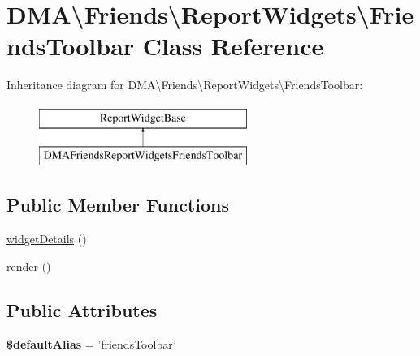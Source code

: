 \hypertarget{classDMA_1_1Friends_1_1ReportWidgets_1_1FriendsToolbar}{\section{D\+M\+A\textbackslash{}Friends\textbackslash{}Report\+Widgets\textbackslash{}Friends\+Toolbar Class Reference}
\label{classDMA_1_1Friends_1_1ReportWidgets_1_1FriendsToolbar}
}
Inheritance diagram for D\+M\+A\textbackslash{}Friends\textbackslash{}Report\+Widgets\textbackslash{}Friends\+Toolbar\+:\begin{figure}[H]
\begin{center}
\leavevmode
\includegraphics[height=2.000000cm]{d4/d8c/classDMA_1_1Friends_1_1ReportWidgets_1_1FriendsToolbar}
\end{center}
\end{figure}
\subsection*{Public Member Functions}
\begin{DoxyCompactItemize}
\item 
\hyperlink{classDMA_1_1Friends_1_1ReportWidgets_1_1FriendsToolbar_a56951946e166c46353910da4a5c399a1}{widget\+Details} ()
\item 
\hyperlink{classDMA_1_1Friends_1_1ReportWidgets_1_1FriendsToolbar_a5fb3de1ff5dd5186e068dcf8c5e8d154}{render} ()
\end{DoxyCompactItemize}
\subsection*{Public Attributes}
\begin{DoxyCompactItemize}
\item 
\hypertarget{classDMA_1_1Friends_1_1ReportWidgets_1_1FriendsToolbar_aabef17c5a99fc5f66554a91dd2cde59d}{{\bfseries \$default\+Alias} = 'friends\+Toolbar'}\label{classDMA_1_1Friends_1_1ReportWidgets_1_1FriendsToolbar_aabef17c5a99fc5f66554a91dd2cde59d}

\end{DoxyCompactItemize}


